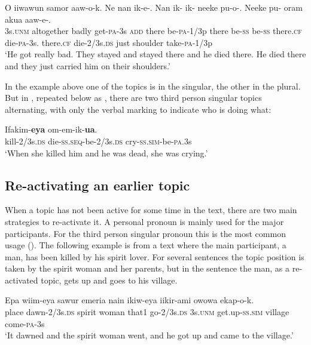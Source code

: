 \ea%
\label{ex:9:x1676}
\gll O  iiwawun  samor  aaw-o-k.  Ne  nan  ik-e-. Nan  ik-  ik-  neeke  pu-o-.  Neeke  pu-  oram akua  aaw-e-.\\
3s.\textsc{unm}  altogether  badly  get-\textsc{pa}-3s  \textsc{add}  there  be-\textsc{pa}-1/3p there  be-\textsc{ss}  be-\textsc{ss}  there.\textsc{cf}  die-\textsc{pa}-3s.  there.\textsc{cf}  die-2/3s.\textsc{ds}  just shoulder  take-\textsc{pa}-1/3p    \\
\glt`He got really bad. They stayed and stayed there and he died there. He died there and they just carried him on their shoulders.'
\z


In the example above one of the topics is in the singular, the other in the plural. But in , repeated below as , there are two third person singular topics alternating, with only the verbal marking to indicate who is doing what:

\ea%
\label{ex:9:x1920}
\gll Ifakim-\textbf{eya}   om-em-ik-\textbf{ua}. \\
kill-2/3s.\textsc{ds}  die-\textsc{ss}.\textsc{seq}-be-2/3s.\textsc{ds}  cry-\textsc{ss}.\textsc{sim}-be-\textsc{pa}.3s     \\
\glt`When she killed him and he was dead, she was crying.'
\z


\subsection{Re-activating an earlier topic} \label{sec:9.2.3}

When a topic has not been active for some time in the text, there are two main strategies to re-activate it. A personal pronoun is mainly used for the major participants. For the third person singular pronoun this is the most common usage (). The following example is from a text where the main participant, a man, has been killed by his spirit lover. For several sentences the topic position is taken by the spirit woman and her parents, but in the sentence  the man, as a re-activated topic, gets up and goes to his village.

\ea%
\label{ex:9:x1921}
\gll Epa  wiim-eya  sawur  emeria  nain  ikiw-eya   iikir-ami  owowa  ekap-o-k. \\
place  dawn-2/3s.\textsc{ds}  spirit  woman  that1  go-2/3s.\textsc{ds} 3s.\textsc{unm}  get.up-\textsc{ss}.\textsc{sim}  village  come-\textsc{pa}-3s     \\
\glt`It dawned and the spirit woman went, and he got up and came to the village.'
\z


